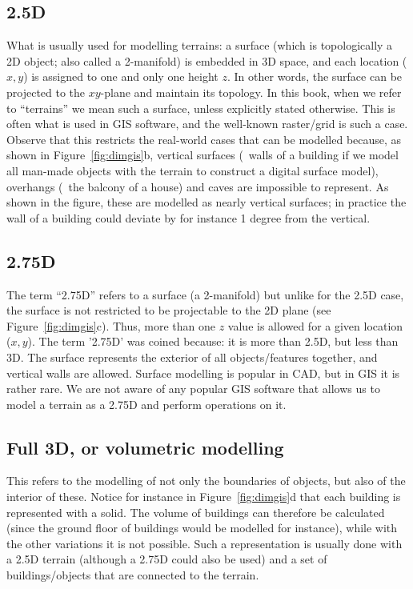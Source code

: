 \subsection{2.5D}%
What is usually used for modelling terrains: a surface (which is topologically a 2D object; also called a 2-manifold) 
is embedded in 3D space, and each location ($x,y$) is assigned to one and only one height $z$.
In other words, the surface can be projected to the $xy$-plane and maintain its topology.
In this book, when we refer to ``terrains'' we mean such a surface, unless explicitly stated otherwise.
This is often what is used in GIS software, and the well-known raster/grid is such a case.
Observe that this restricts the real-world cases that can be modelled because, as shown in Figure~\ref{fig:dimgis}b, vertical surfaces (\eg\ walls of a building if we model all man-made objects with the terrain to construct a digital surface model), overhangs (\eg\ the balcony of a house) and caves are impossible to represent.
As shown in the figure, these are modelled as nearly vertical surfaces; in practice the wall of a building could deviate by for instance 1 degree from the vertical. 

\subsection{2.75D}%
The term ``2.75D'' refers to a surface (a 2-manifold) but unlike for the 2.5D case, the surface is not restricted to be projectable to the 2D plane (see Figure~\ref{fig:dimgis}c).
Thus, more than one $z$ value is allowed for a given location ($x,y$).
The term '2.75D' was coined because: it is more than 2.5D, but less than 3D.
The surface represents the exterior of all objects/features together, and vertical walls are allowed.
Surface modelling is popular in CAD, but in GIS it is rather rare.
We are not aware of any popular GIS software that allows us to model a terrain as a 2.75D and perform operations on it.

\subsection[3D]{Full 3D, or volumetric modelling} 
This refers to the modelling of not only the boundaries of objects, but also of the interior of these.
Notice for instance in Figure~\ref{fig:dimgis}d that each building is represented with a solid.
The volume of buildings can therefore be calculated (since the ground floor of buildings would be modelled for instance), while with the other variations it is not possible. 
Such a representation is usually done with a 2.5D terrain (although a 2.75D could also be used) and a set of buildings/objects that are connected to the terrain.



